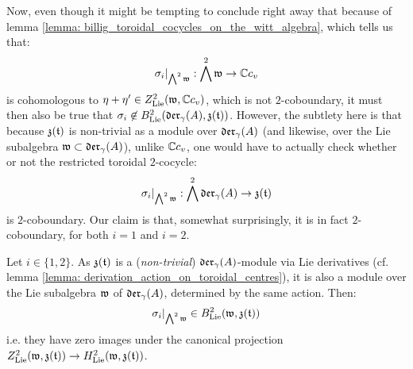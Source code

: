         Now, even though it might be tempting to conclude right away that because of lemma \ref{lemma: billig_toroidal_cocycles_on_the_witt_algebra}, which tells us that:
            $$\sigma_i|_{\bigwedge^2 \mathfrak{w}}: \bigwedge^2 \mathfrak{w} \to \mathbb{C} c_v$$
        is cohomologous to $\eta + \eta' \in Z^2_{\mathrm{Lie}}(\mathfrak{w}, \mathbb{C} c_v)$, which is not $2$-coboundary, it must then also be true that $\sigma_i \not \in B^2_{\mathrm{Lie}}(\mathfrak{der}_{\gamma}(A), \mathfrak{z}(\mathfrak{t}))$. However, the subtlety here is that because $\mathfrak{z}(\mathfrak{t})$ is non-trivial as a module over $\mathfrak{der}_{\gamma}(A)$ (and likewise, over the Lie subalgebra $\mathfrak{w} \subset \mathfrak{der}_{\gamma}(A)$), unlike $\mathbb{C} c_v$, one would have to actually check whether or not the restricted toroidal $2$-cocycle:
            $$\sigma_i|_{\bigwedge^2 \mathfrak{w}}: \bigwedge^2 \mathfrak{der}_{\gamma}(A) \to \mathfrak{z}(\mathfrak{t})$$
        is $2$-coboundary. Our claim is that, somewhat surprisingly, it is in fact $2$-coboundary, for both $i = 1$ and $i = 2$.
        \begin{lemma} \label{lemma: restrictions_of_billig_toroidal_cocycles_are_coboundary}
            Let $i \in \{1, 2\}$. As $\mathfrak{z}(\mathfrak{t})$ is a (\textit{non-trivial}) $\mathfrak{der}_{\gamma}(A)$-module via Lie derivatives (cf. lemma \ref{lemma: derivation_action_on_toroidal_centres}), it is also a module over the Lie subalgebra $\mathfrak{w}$ of $\mathfrak{der}_{\gamma}(A)$, determined by the same action. Then:
                $$\sigma_i|_{ \bigwedge^2 \mathfrak{w} } \in B^2_{\mathrm{Lie}}(\mathfrak{w}, \mathfrak{z}(\mathfrak{t}))$$
            i.e. they have zero images under the canonical projection $Z^2_{\mathrm{Lie}}(\mathfrak{w}, \mathfrak{z}(\mathfrak{t})) \to H^2_{\mathrm{Lie}}(\mathfrak{w}, \mathfrak{z}(\mathfrak{t}))$. 
        \end{lemma}
